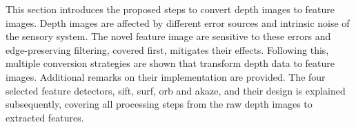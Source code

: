 This section introduces the proposed steps to convert depth images to feature images.
Depth images are affected by different error sources and intrinsic noise of the sensory system.
The novel feature image are sensitive to these errors and edge-preserving filtering, covered first, mitigates their effects.
Following this, multiple conversion strategies are shown that transform depth data to feature images.
Additional remarks on their implementation are provided.
The four selected feature detectors, \acrshort{sift}, \acrshort{surf}, \acrshort{orb} and \acrshort{akaze}, and their design is explained subsequently, covering all processing steps from the raw depth images to extracted features.
